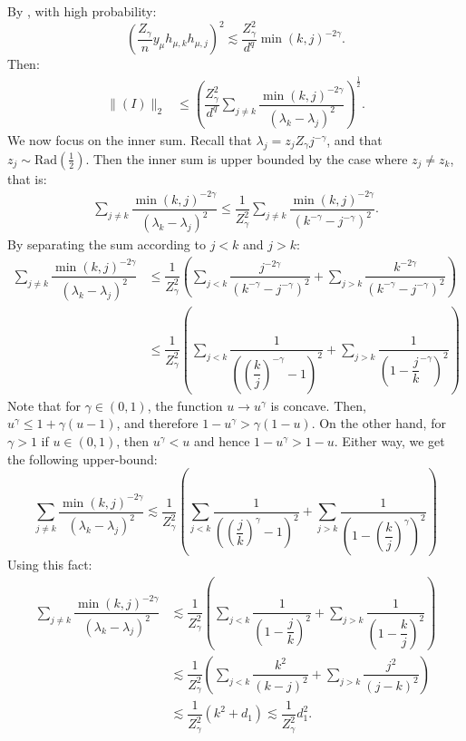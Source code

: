 \documentclass[]{article}
\numberwithin{equation}{section}
\theoremstyle{definition}
\begin{document}
By , with high probability: 
\begin{equation}
    \left ( \dfrac{Z_\gamma}{n} y_\mu h_{\mu,k} h_{\mu,j} \right )^{2} \lesssim \dfrac{Z_\gamma^2}{d^{q}} \min(k,j)^{-2\gamma}.
\end{equation}
Then: 
\begin{align}
    \| (I) \|_2 & \leq \left (\dfrac{Z_\gamma^2}{d^{q}} \sum_{j \not = k}  \dfrac{\min(k,j)^{-2\gamma}}{(\lambda_k - \lambda_j)^{2}}  \right )^{\frac{1}{2}}.
    \label{eq:bound_I_part_1}
\end{align}
We now focus on the inner sum. Recall that $\lambda_{j} = z_{j} Z_\gamma j^{-\gamma}$, and that $z_j \sim \mathrm{Rad}(\frac{1}{2})$. Then the inner sum is upper bounded by the case where $z_{j} \not = z_{k}$, that is:  
\begin{align}
    \sum_{j \not = k}  \dfrac{\min(k,j)^{-2\gamma}}{(\lambda_k - \lambda_j)^{2}} \leq \dfrac{1}{Z_\gamma^{2}}\sum_{j \not = k}  \dfrac{\min(k,j)^{-2\gamma}}{(k^{-\gamma} - j^{-\gamma})^{2}}. 
\end{align}
By separating the sum according to $j <k$ and $j >k$: 
\begin{align}
     \sum_{j \not = k}  \dfrac{\min(k,j)^{-2\gamma}}{(\lambda_k - \lambda_j)^{2}} &\leq \dfrac{1}{Z_\gamma^{2}}\left ( \sum_{j < k}  \dfrac{j^{-2\gamma}}{(k^{-\gamma} - j^{-\gamma})^{2}}+ \sum_{j > k}  \dfrac{k^{-2\gamma}}{(k^{-\gamma} - j^{-\gamma})^{2}} \right ) \\ 
     & \leq \dfrac{1}{Z_\gamma^{2}}\left ( \sum_{j < k}  \dfrac{1}{\left (\left ( \dfrac{k}{j} \right )^{-\gamma} - 1 \right )^{2}}+ \sum_{j > k}  \dfrac{1}{\left (1 - \dfrac{j}{k}^{-\gamma} \right )^{2}} \right ) 
\end{align}
Note that for $\gamma \in (0,1)$, the function $u \to u^{\gamma}$ is concave. Then, $u^{\gamma} \leq 1+\gamma (u -1) $, and therefore  $1-u^{\gamma} > \gamma(1- u)$. On the other hand, for $\gamma >1$ if $u \in (0,1)$, then $ u ^{\gamma } <u$ and hence $1-u^{\gamma} > 1-u$. Either way, we get the following upper-bound: 
\begin{equation}
    \sum_{j \not = k}  \dfrac{\min(k,j)^{-2\gamma}}{(\lambda_k - \lambda_j)^{2}} \lesssim \dfrac{1}{Z_\gamma^{2}}\left ( \sum_{j < k}  \dfrac{1}{\left (\left ( \dfrac{j}{k} \right )^{\gamma} - 1 \right )^{2}}+ \sum_{j > k}  \dfrac{1}{\left (1 - \left ( \dfrac{k}{j} \right )^{\gamma} \right )^{2}} \right ) 
\end{equation}
Using this fact: 
\begin{align}
    \sum_{j \not = k}  \dfrac{\min(k,j)^{-2\gamma}}{(\lambda_k - \lambda_j)^{2}} &\lesssim \dfrac{1}{Z_\gamma^{2}}\left ( \sum_{j < k}  \dfrac{1}{\left (1-\dfrac{j}{k}  \right )^{2}}+ \sum_{j > k}  \dfrac{1}{\left (1 -  \dfrac{k}{j} \right )^{2}} \right ) \\
    & \lesssim \dfrac{1}{Z_\gamma^{2}} \left ( \sum_{j < k}  \dfrac{k^2}{\left (k-j  \right )^{2}}+ \sum_{j > k}  \dfrac{j^2}{\left (j -  k\right )^{2}} \right ) \\
    & \lesssim  \dfrac{1}{Z_\gamma^{2}} \left ( k^2+ d_1 \right )\lesssim \dfrac{1}{Z_\gamma^{2}}d_1^{2}. 
\end{align}
\end{document}

